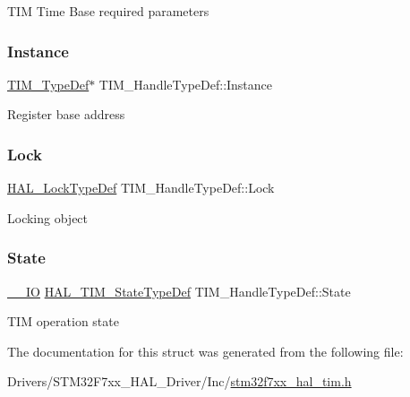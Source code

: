 T\+IM Time Base required parameters \mbox{\label{struct_t_i_m___handle_type_def_ad0c5f736a15f6d8d14724854c8133bcc}} 
\subsubsection{\texorpdfstring{Instance}{Instance}}
{\footnotesize\ttfamily \mbox{\hyperlink{struct_t_i_m___type_def}{T\+I\+M\+\_\+\+Type\+Def}}$\ast$ T\+I\+M\+\_\+\+Handle\+Type\+Def\+::\+Instance}

Register base address \mbox{\label{struct_t_i_m___handle_type_def_a2a24b963b57150ed2fb0f051cd87b65a}} 
\subsubsection{\texorpdfstring{Lock}{Lock}}
{\footnotesize\ttfamily \mbox{\hyperlink{stm32f7xx__hal__def_8h_ab367482e943333a1299294eadaad284b}{H\+A\+L\+\_\+\+Lock\+Type\+Def}} T\+I\+M\+\_\+\+Handle\+Type\+Def\+::\+Lock}

Locking object \mbox{\label{struct_t_i_m___handle_type_def_a6b6eeaf94f2e6e3d0a5bdac44adf21d6}} 
\subsubsection{\texorpdfstring{State}{State}}
{\footnotesize\ttfamily \mbox{\hyperlink{core__sc300_8h_aec43007d9998a0a0e01faede4133d6be}{\+\_\+\+\_\+\+IO}} \mbox{\hyperlink{group___t_i_m___exported___types_gae0994cf5970e56ca4903e9151f40010c}{H\+A\+L\+\_\+\+T\+I\+M\+\_\+\+State\+Type\+Def}} T\+I\+M\+\_\+\+Handle\+Type\+Def\+::\+State}

T\+IM operation state 

The documentation for this struct was generated from the following file\+:\begin{DoxyCompactItemize}
\item 
Drivers/\+S\+T\+M32\+F7xx\+\_\+\+H\+A\+L\+\_\+\+Driver/\+Inc/\mbox{\hyperlink{stm32f7xx__hal__tim_8h}{stm32f7xx\+\_\+hal\+\_\+tim.\+h}}\end{DoxyCompactItemize}
